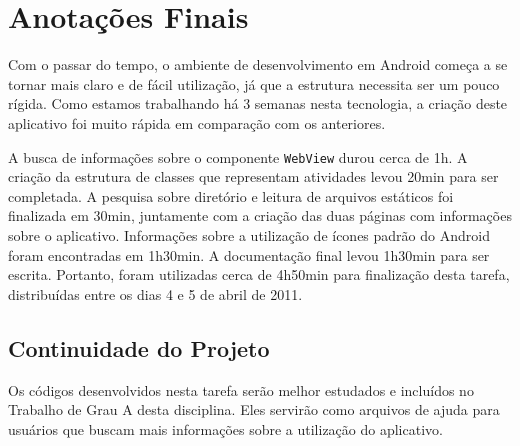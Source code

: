 \documentclass{article}
\begin{document}
\section{Anotações Finais}
\label{sec:finais}

Com o passar do tempo, o ambiente de desenvolvimento em Android começa a se
tornar mais claro e de fácil utilização, já que a estrutura necessita ser um
pouco rígida. Como estamos trabalhando há 3 semanas nesta tecnologia, a criação
deste aplicativo foi muito rápida em comparação com os anteriores.

A busca de informações sobre o componente \texttt{WebView} durou cerca de 1h. A
criação da estrutura de classes que representam atividades levou 20min para ser
completada. A pesquisa sobre diretório e leitura de arquivos estáticos foi
finalizada em 30min, juntamente com a criação das duas páginas com informações
sobre o aplicativo. Informações sobre a utilização de ícones padrão do Android
foram encontradas em 1h30min. A documentação final levou 1h30min para ser
escrita. Portanto, foram utilizadas cerca de 4h50min para finalização desta
tarefa, distribuídas entre os dias 4 e 5 de abril de 2011.

\subsection{Continuidade do Projeto}

Os códigos desenvolvidos nesta tarefa serão melhor estudados e incluídos no
Trabalho de Grau A desta disciplina. Eles servirão como arquivos de ajuda para
usuários que buscam mais informações sobre a utilização do aplicativo.
\end{document}
